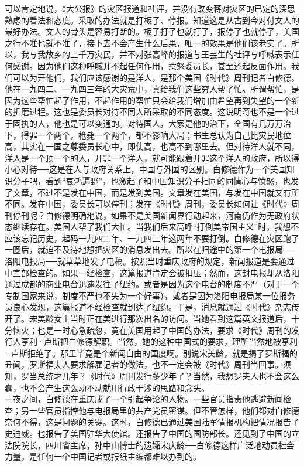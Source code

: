 可以肯定地说，《大公报》的灾区报道和社评，并没有改变蒋对灾区的已定的深思熟虑的看法和态度。采取的办法就是打板子、停报。知道这是从古到今对付文人的最好办法。文人的骨头是容易打断的。板子打了也就打了，报停了也就停了，美国之行不准也就不准了，接下去不会产生什么后果，唯一的效果是他们该老实了。所以，我与我故乡的三千万灾民，并不对张高峰的报道与王芸生的社评与呼喊表示任何感谢。因为他们这种呼喊并不起任何作用，惹怒委员长，甚至还起反面作用。我们可以为开他们，我们应该感谢的是洋人，是那个美国《时代》周刊记者白修德。他在一九四二、一九四三年的大灾荒中，真给我们这些穷人帮了忙。所谓帮忙，是因为这些帮忙起了作用，不起作用的帮忙只会给我们增加由希望再到失望的一个新的折磨过程。这也是委员长对待不同人所采取的不同态度。这说明蒋也不是一个过于固执的人，他也是可以变通的。对待国人，大家是他的治下，全国有几万万治下，得罪一个两个，枪毙一个两个，都不影响大局；书生总认为自己比灾民地位高，其实在一国之尊委员长心中，即使高，也高不到哪里去。但对待洋人就不同，洋人是一个顶一个的人，开罪一个洋人，就可能跟着开罪这个洋人的政府，所以得小心对待{\Add ──}这是在人与政府关系上，中国与外国的区别。白修德作为一个美国知识分子吧，看到“哀鸿遍野”，也激起了和中国知识分子相同的同情心与愤怒，也发了文章，不过不是发在中国，而是发到美国。文章发在美国，与发在中国就又有所不同。发在中国，委员长可以停刊；发在《时代》周刊，委员长如何让《时代》周刊停刊呢？白修德明确地说，如果不是美国新闻界行动起来，河南仍作为无政府状态继续存在。美国人帮了我们大忙。当我们后来高呼“打倒美帝国主义”时，我想不应该忘记历史，起码一九四二年、一九四三年这两年不要打倒。白修德在灾区跑了一圈后，就迫不及待地想把灾区的消息发出去。所以在归途中的第一个电报局{\Add ──}洛阳电报局{\Add ──}就草草地发了电稿。按照当时重庆政府的规定，新闻报道是要通过中宣部检查的。如果一经检查，这篇报道肯定会被扣压；然而，这封电报却从洛阳通过成都的商业电台迅速发往了纽约。或者是因为这个电台的制度不严（对于一个专制国家来说，制度不严也不失为一个好事），或者是因为洛阳电报局某一位报务员良心发现，这篇报道不经检查就到达了纽约。于是，消息就通过《时代》杂志传开了。宋美龄女士当时正在美进行那次出名的访问。当她看到这篇英文报道后，十分恼火；也是一时心急疏忽，竟在美国用起了中国的办法，要求《时代》周刊的发行人亨利·卢斯把白修德解职。当然，她的这种中国式的要求，理所当然地被亨利·卢斯拒绝了。那里毕竟是个新闻自由的国度啊。别说宋美龄，就是揭了罗斯福的丑闻，罗斯福夫人要求解雇记者的做法，也不一定会被《时代》周刊当回事。须知，罗当总统才几年？《时代》周刊发行多少年了？当然，我想罗夫人也不会这么蠢，也不会产生这么动不动就用行政干涉的思路和念头。\\

一夜之间，白修德在重庆成了一个引起争论的人物。一些官员指责他逃避新闻检查；另一些官员指控他与电报局里的共产党员密谋。但不管怎样，他们都对白修德奈何不得，这是问题的关键。这时，白修德已通过美国陆军情报机构把情况报告了史迪威。也报告了美国驻华大使馆。还报告了中国的国防部长。还见到了中国的立法院院长，四川省主席，孙中山博士的遗孀宋庆龄{\Add ──}白修德这样广泛地动员社会力量，是任何一个中国记者或报纸主编都难以办到的。\\


